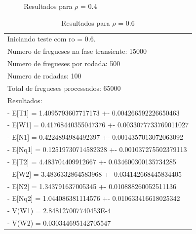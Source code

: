 \documentclass[a4paper,12pt]{report}
\begin{document}
\begin{figure}[htbp]
   \centering
   \caption{Resultados para $\rho$ = 0.4}
\end{figure}

\begin{table}[htbp]
  \begin{tabular}{l}
	\small Iniciando teste com ro = 0.6. \\
	\small Numero de fregueses na fase transiente: 15000 \\
	\small Numero de fregueses por rodada: 500 \\
	\small Numero de rodadas: 100 \\
	\small Total de fregueses processados: 65000 \\
	\small Resultados: \\
	\small - E[T1] = 1.4095793607717173 +- 0.004266592226650463 \\
	\small - E[W1] = 0.41768440355047376 +- 0.0033077733769011027 \\
	\small - E[N1] = 0.4224894984492397 +- 0.0014357013072063092 \\
	\small - E[Nq1] = 0.12519730714582328 +- 0.001037275502379113 \\
	\small - E[T2] = 4.483704409912667 +- 0.034600300135734285 \\
	\small - E[W2] = 3.4836332864583968 +- 0.034142668445834405 \\
	\small - E[N2] = 1.343791637005345 +- 0.010888260052511136 \\
	\small - E[Nq2] = 1.044086381114576 +- 0.010633416618025342 \\
	\small - V(W1) = 2.848127007740453E-4 \\
	\small - V(W2) = 0.030344695142705547 \\
  \end{tabular}
\caption{Resultados para $\rho$ = 0.6}
\end{table}
\end{document}
